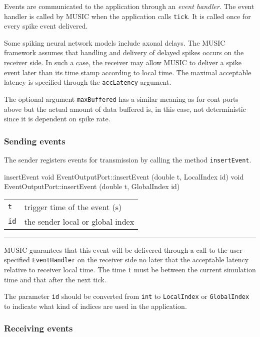 \documentclass[a4paper,twoside]{report}
\makeatletter
\newenvironment{parameters}%
{\begin{tabular}{@{\hspace{2em}}lp{0.6\textwidth}}}%
{\end{tabular}\par\vspace{1mm}\par\hrule\par\vspace{5mm}}
\makeatother
\begin{document}
Events are communicated to the application through an \emph{event
  handler}.  The event handler is called by MUSIC
when the application calls \lstinline|tick|.  It is called once for
every spike event delivered.

Some spiking neural network models include axonal delays.  The MUSIC
framework assumes that handling and delivery of delayed spikes occurs
on the receiver side.  In such a case, the receiver may allow MUSIC to
deliver a spike event later than its time stamp according to local
time.  The maximal acceptable latency is specified through the
\lstinline|accLatency| argument.

The optional argument \lstinline|maxBuffered|
has a similar meaning as for cont ports above but the actual amount
of data buffered is, in this case, not deterministic since it is
dependent on spike rate.

\pagebreak
\subsubsection{Sending events}

The sender registers events for transmission by calling the method
\lstinline|insertEvent|.

\begin{head}{insertEvent}
  void EventOutputPort::insertEvent (double t, LocalIndex id)
  void EventOutputPort::insertEvent (double t, GlobalIndex id)
\end{head}
\begin{parameters}
  \lstinline|t| & trigger time of the event (s) \\
  \lstinline|id| & the sender local or global index \\
\end{parameters}

MUSIC guarantees that this event will be delivered through a call to
the user-specified \lstinline|EventHandler| on the receiver side no
later that the acceptable latency relative to receiver local time.
The time \lstinline|t| must be between the current simulation time
and that after the next tick.

The parameter \lstinline|id| should be converted from \lstinline|int|
to \lstinline|LocalIndex| or \lstinline|GlobalIndex| to indicate what
kind of indices are used in the application.


\subsubsection{Receiving events}
\end{document}
